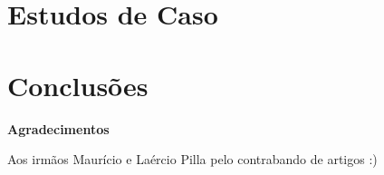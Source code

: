 \documentclass{SBCbookchapter}
\begin{document}
\section{Estudos de Caso}
\label{sec:estudos}


\section{Conclusões}
\label{sec:conclusoes}


\begin{center}
	\textbf{Agradecimentos}
\end{center}
Aos irmãos Maurício e Laércio Pilla pelo contrabando de artigos :)
	



\end{document}
